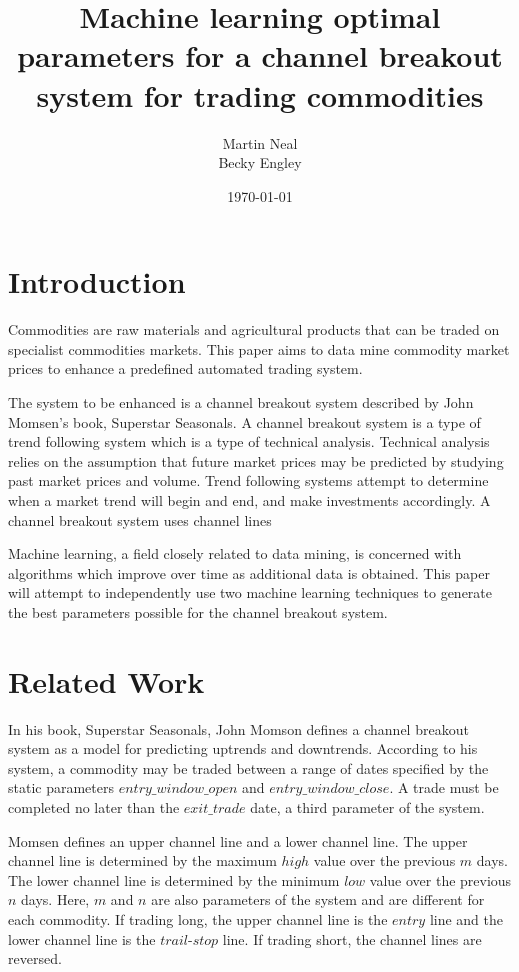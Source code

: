 \documentclass[10pt]{article}
\title{Machine learning optimal parameters for a channel breakout system for trading
commodities}
\author{Martin Neal\\
  Becky Engley}
\date{\today}
\begin{document}
\maketitle

\section{Introduction}

Commodities are raw materials and agricultural products that can be traded on
specialist commodities markets.  This paper aims to data mine commodity market
prices to enhance a predefined automated trading system.

The system to be enhanced is a channel breakout system described by John
Momsen's book, Superstar Seasonals.  A channel breakout system is a type of
trend following system which is a type of technical analysis.  Technical
analysis relies on the assumption that future market prices may be predicted by
studying past market prices and volume.  Trend following systems attempt to
determine when a market trend will begin and end, and make investments
accordingly.  A channel breakout system uses channel lines

Machine learning, a field closely related to data mining, is concerned with
algorithms which improve over time as additional data is obtained.  This paper
will attempt to independently use two machine learning techniques to generate
the best parameters possible for the channel breakout system.



\section{Related Work}

In his book, Superstar Seasonals, John Momson defines a channel breakout system
as a model for predicting uptrends and downtrends.  According to his system, a
commodity may be traded between a range of dates specified by the static parameters
$entry\_window\_open$ and $entry\_window\_close$.  A trade must be completed no
later than the $exit\_trade$ date, a third parameter of the system.

Momsen defines an upper channel line and a lower channel line.  The upper
channel line is determined by the maximum $high$ value over the previous $m$
days.  The lower channel line is determined by the minimum $low$ value over the
previous $n$ days.  Here, $m$ and $n$ are also parameters of the system and are
different for each commodity.  If trading long, the upper channel line is the
$entry$ line and the lower channel line is the $trail$-$stop$ line.  If trading
short, the channel lines are reversed.
\end{document}

